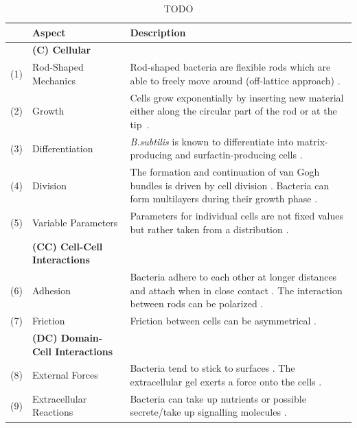 \documentclass{article}
\begin{document}
\begin{table}[H]
    \centering
    \def\arraystretch{1.3}
    \begin{tabularx}{\textwidth}{c l X}
        &\textbf{Aspect} & \textbf{Description}\\
        \toprule
        &\textbf{(C) Cellular}\\
        \midrule
        (1) & Rod-Shaped Mechanics &
            Rod-shaped bacteria are flexible rods which are able to freely move around (off-lattice
            approach) \cite{Takeuchi2005,Ursell2014,Amir2014_2}.\\
        (2) & Growth &
            Cells grow exponentially by inserting new material either along the circular part of the
            rod or at the tip~\cite{Robert2014,Takeuchi2005}.\\
        (3) & Differentiation &
            \textit{B.subtilis} is known to differentiate into matrix-producing and
            surfactin-producing cells \cite{vanGestel2015,Lpez2010}.\\
        (4) & Division &
            The formation and continuation of van Gogh bundles is driven by cell division
            \cite{vanGestel2015}.
            Bacteria can form multilayers during their growth phase \cite{Duvernoy2018}.\\
        (5) & Variable Parameters &
            Parameters for individual cells are not fixed values but rather taken from a
            distribution \cite{Koutsoumanis2013}.\\
        &\textbf{(CC) Cell-Cell Interactions}\\
        \midrule
        (6) & Adhesion &
            Bacteria adhere to each other at longer distances and attach when in close contact
            \cite{Verwey1947,Trejo2013}.
            The interaction between rods can be polarized \cite{Duvernoy2018}.\\
        (7) & Friction &
            Friction between cells \cite{Grant2014} can be asymmetrical \cite{Doumic2020}.\\
        &\textbf{(DC) Domain-Cell Interactions}\\
        \midrule
        (8) & External Forces &
            Bacteria tend to stick to surfaces \cite{vanLoosdrecht1989}.
            The extracellular gel exerts a force onto the cells \cite{Grant2014}.\\
        (9) & Extracellular Reactions &
            Bacteria can take up nutrients or possible secrete/take up signalling molecules
            \cite{Li2025}.\\
        \bottomrule
    \end{tabularx}
    \label{table:simulation-aspects-supplement}
    \caption{TODO}
\end{table}
\end{document}

